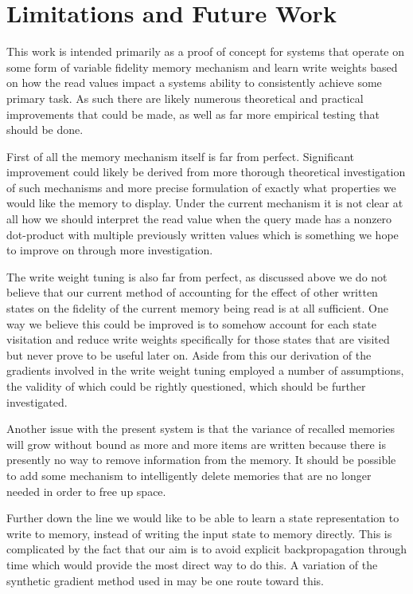 \documentclass{article}
\begin{document}
\section*{Limitations and Future Work}
This work is intended primarily as a proof of concept for systems that operate on some form of variable fidelity memory mechanism and learn write weights based on how the read values impact a systems ability to consistently achieve some primary task. As such there are likely numerous theoretical and practical improvements that could be made, as well as far more empirical testing that should be done. 

First of all the memory mechanism itself is far from perfect. Significant improvement could likely be derived from more thorough theoretical investigation of such mechanisms and more precise formulation of exactly what properties we would like the memory to display. Under the current mechanism it is not clear at all how we should interpret the read value when the query made has a nonzero dot-product with multiple previously written values which is something we hope to improve on through more investigation.

The write weight tuning is also far from perfect, as discussed above we do not believe that our current method of accounting for the effect of other written states on the fidelity of the current memory being read is at all sufficient. One way we believe this could be improved is to somehow account for each state visitation and reduce write weights specifically for those states that are visited but never prove to be useful later on. Aside from this our derivation of the gradients involved in the write weight tuning employed a number of assumptions, the validity of which could be rightly questioned, which should be further investigated.

Another issue with the present system is that the variance of recalled memories will grow without bound as more and more items are written because there is presently no way to remove information from the memory. It should be possible to add some mechanism to intelligently delete memories that are no longer needed in order to free up space.

Further down the line we would like to be able to learn a state representation to write to memory, instead of writing the input state to memory directly. This is complicated by the fact that our aim is to avoid explicit backpropagation through time which would provide the most direct way to do this. A variation of the synthetic gradient method used in \cite{SYNTH} may be one route toward this.
\end{document}

